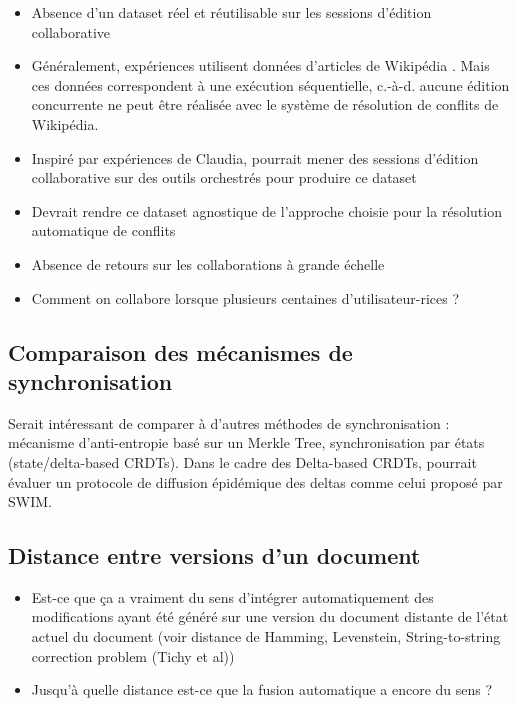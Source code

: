 \documentclass[12pt]{thesul}
\newcommand{\ie}{c.-à-d. }
\begin{document}
\begin{itemize}
  \item Absence d'un dataset réel et réutilisable sur les sessions d'édition collaborative
  \item Généralement, expériences utilisent données d'articles de Wikipédia .
    Mais ces données correspondent à une exécution séquentielle, \ie aucune édition concurrente ne peut être réalisée avec le système de résolution de conflits de Wikipédia.
  \item Inspiré par expériences de Claudia, pourrait mener des sessions d'édition collaborative sur des outils orchestrés pour produire ce dataset
  \item Devrait rendre ce dataset agnostique de l'approche choisie pour la résolution automatique de conflits
  \item Absence de retours sur les collaborations à grande échelle
  \item Comment on collabore lorsque plusieurs centaines d'utilisateur-rices ?
\end{itemize}

\subsection{Comparaison des mécanismes de synchronisation}

Serait intéressant de comparer à d'autres méthodes de synchronisation : mécanisme d'anti-entropie basé sur un Merkle Tree\cite{2007-dynamo, 2015-approximate-hash-based-set-reconciliation, 2017-anti-entropy-without-merkle-trees}, synchronisation par états (state/delta-based \acp{CRDT}).
Dans le cadre des Delta-based \acp{CRDT}, pourrait évaluer un protocole de diffusion épidémique des deltas comme celui proposé par SWIM\cite{swim2002}.

\subsection{Distance entre versions d'un document}

\begin{itemize}
  \item Est-ce que ça a vraiment du sens d'intégrer automatiquement des modifications ayant été généré sur une version du document distante de l'état actuel du document (voir distance de Hamming, Levenstein, String-to-string correction problem (Tichy et al))
  \item Jusqu'à quelle distance est-ce que la fusion automatique a encore du sens ?
\end{itemize}
\end{document}
